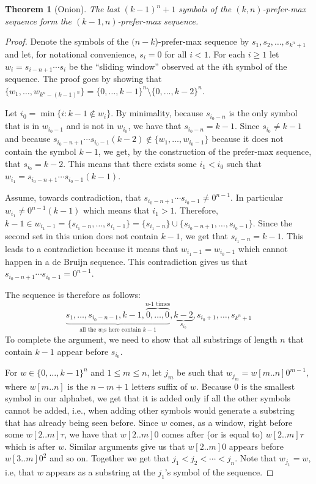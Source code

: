 \documentclass{article}
\newtheorem{reptheorem}{Theorem}
\newenvironment{repeatedtheorem}[1]
{
	\setcounterref{reptheorem}{#1}
	\addtocounter{reptheorem}{-1}
	\begin{reptheorem}
	}{			
	\end{reptheorem}
}
\theoremstyle{definition}
\begin{document}
\begin{repeatedtheorem}{thm:onion}[Onion]
	{The last $(k-1)^n+1$ symbols of the $(k,n)$-prefer-max sequence form the $(k-1,n)$-prefer-max sequence.}
\end{repeatedtheorem}
\begin{proof}
	Denote the symbols of the $(n-k$)-prefer-max sequence by
	$s_1,s_2,\dots,s_{k^n+1}$ and let, for notational convenience, $s_i=0$ for all
	$i<1$.  For each $i\geq 1$ let $w_i=s_{i-n+1}\cdots s_i$ be the ``sliding window''
	observed at the $i$th symbol of the sequence. 
	The proof goes by showing that $\{w_1,\dots,w_{k^n-(k-1)^n}\} = \{0,\dots,k-1\}^n \setminus \{0,\dots,k-2\}^n$.
	
	Let ${i_0} = \min\{i\colon k-1 \notin w_i\}$. 
	By minimality, because  $s_{{i_0}-n}$ is the only symbol that is in $w_{i_0-1}$ and is not in $w_{i_0}$, 
	we have that $s_{{i_0}-n}=k-1$. Since $s_{i_0} \neq k-1$ and
	because $s_{{i_0}-n+1}\cdots s_{{i_0}-1} (k-2) \notin \{w_1,\dots,w_{i_0-1}\}$ because it does not contain the symbol $k-1$, 
	we get, by the construction of the prefer-max sequence,
	that $s_{{i_0}}=k-2$. This means that there exists some ${i_1}<{i_0}$ such that
	$w_{i_1} = s_{{i_0}-n+1}\cdots s_{{i_0}-1}(k-1)$.
	
	Assume, towards contradiction, that $s_{{i_0}-n+1}\cdots s_{{i_0}-1} \neq
	0^{n-1}$. In particular $w_{i_1} \neq 0^{n-1}(k-1)$ which
	means that ${i_1} > 1$. Therefore, $k-1  \in w_{i_1-1}=
	\{s_{{i_1}-n},\dots,s_{{i_1}-1}\}=\{s_{{i_1}-n}\} \cup
	\{s_{{i_0}-n+1},\dots,s_{{i_0}-1}\}$. Since the second set in this union does
	not contain $k-1$, we get that $s_{{i_1}-n}=k-1$. This leads to a contradiction
	because it means that $w_{{i_1}-1} = w_{{i_0}-1}$ which cannot happen in a de Bruijn sequence. This contradiction
	gives us that $s_{{i_0}-n+1}\cdots s_{{i_0}-1} = 0^{n-1}$.
	
	The sequence is therefore as follows:
	$$\underbrace{s_1,\dots,s_{i_0-n-1},k-1,\overbrace{0,\dots,0}^\text{$n\text{-}1$ times}}_{\text{all the $w_i$s here contain
				$k-1$}},\underbrace{k-2}_{s_{i_0}},s_{i_0+1},\dots,s_{k^n+1}$$
	To complete the argument, we need to show that all substrings of length $n$ that
	contain $k-1$ appear before $s_{i_0}$.
	
	For $w \in \{0,\dots,k-1\}^n$ and $1 \leq m \leq n$, let $j_m$ be such that
	$w_{j_m} = w[m..n]0^{m-1}$, where $w[m..n]$ is the $n-m+1$
	letters suffix of $w$. 
	Because $0$ is the smallest symbol in our alphabet, we get that it is added
	only if all the other symbols cannot be added, i.e., when adding other symbols
	would generate a substring that has already being seen before. 
	Since $w$ comes, as a window, right before some $w[2..m]\tau$,
	we have that $w[2..m]0$ comes after (or is equal to) $w[2..m]\tau$ which is
	after $w$. Similar arguments give us that $w[2..m]0$ appears before $w[3..m]0^2$ and
	so on. Together we get that $j_1 < j_2 < \cdots < j_n$. Note that $w_{j_1}=w$, 
	i.e, that $w$ appears as a substring at the $j_1$'s symbol of the
	sequence.
	

\end{proof}
\end{document}
